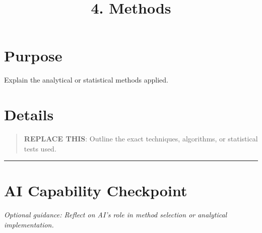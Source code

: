 \documentclass[
]{report}
\title{4. Methods}
\author{}
\date{}
\renewcommand*\contentsname{Table of contents}
\newcommand\contentsname{Table of contents}
\begin{document}
\maketitle

\renewcommand*\contentsname{Table of contents}
{
\hypersetup{linkcolor=}
\setcounter{tocdepth}{2}
\tableofcontents
}

\chapter{Purpose}\label{purpose}

Explain the analytical or statistical methods applied.

\chapter{Details}\label{details}

\begin{quote}
\textbf{REPLACE THIS}: Outline the exact techniques, algorithms, or
statistical tests used.
\end{quote}

\begin{center}\rule{0.5\linewidth}{0.5pt}\end{center}

\chapter{AI Capability Checkpoint}\label{ai-capability-checkpoint}

\emph{Optional guidance: Reflect on AI's role in method selection or
analytical implementation.}
\end{document}
